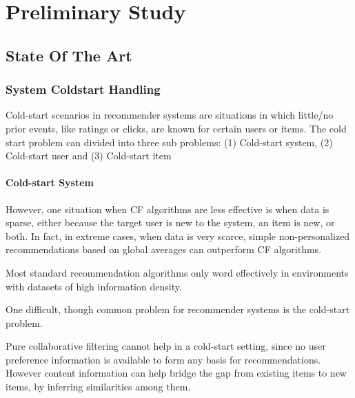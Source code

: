 
\chapter{Preliminary Study}
\minitoc

\clearpage

\section{State Of The Art}
\subsection{System Coldstart Handling}

Cold-start scenarios in recommender systems are situations in which little/no
prior events, like ratings or clicks, are known for certain users or items. The
cold start problem can divided into three sub problems: (1) Cold-start system,
(2) Cold-start user and (3) Cold-start item

\subsubsection{Cold-start System}


However, one situation when CF algorithms are less effective is when data is
sparse, either because the target user is new to the system, an item is new, or
both. In fact, in extreme cases, when data is very scarce, simple
non-personalized recommendations based on global averages can outperform CF
algorithms.

Most standard recommendation algorithms only word effectively in environments
with datasets of high information density.

One difficult, though common problem for recommender systems is the cold-start
problem.

Pure collaborative filtering cannot help in a cold-start setting, since no user
preference information is available to form any basis for recommendations.
However content information can help bridge the gap from existing items to new
items, by inferring similarities among them.


